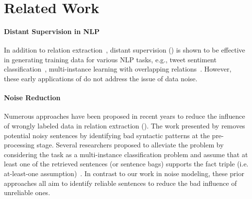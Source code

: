 \section{Related Work}

\paragraph{Distant Supervision in NLP} In addition to relation extraction~\cite{mintz2009distant}, distant supervision
(\DS) is shown to be effective in generating training data for various NLP tasks, e.g., tweet sentiment
classification~\cite{go2009twitter}, multi-instance learning with overlapping relations~\cite{ritter2011named}.
However, these early applications of \DS do not address the issue of data noise.


\paragraph{Noise Reduction}
Numerous approaches have been proposed in recent years to reduce the influence of wrongly labeled data in relation extraction (\RE).
The work presented by \cite{takamatsu2012reducing} removes potential noisy sentences by identifying bad syntactic
patterns at the pre-processing stage. Several researchers proposed to alleviate the problem by considering the \RE task
as a multi-instance classification
problem and assume
that at least one of the retrieved sentences (or sentence bags) supports the fact triple (i.e. at-least-one assumption)~\cite{riedel2010modeling,hoffmann2011knowledge,surdeanu2012multi,zeng2015distant,lin2016neural}.
In contrast to our work in noise modeling, these prior approaches all aim to identify reliable sentences to reduce
the bad influence of unreliable ones.

